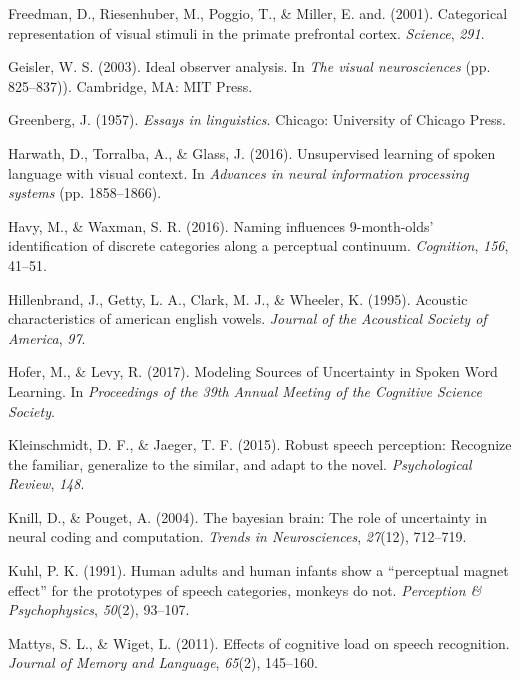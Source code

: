 \documentclass[english,floatsintext,man]{apa6}
\theoremstyle{definition}
\theoremstyle{definition}
\theoremstyle{definition}
\theoremstyle{remark}
\begin{document}
\hypertarget{ref-freedman2001}{}
Freedman, D., Riesenhuber, M., Poggio, T., \& Miller, E. and. (2001).
Categorical representation of visual stimuli in the primate prefrontal
cortex. \emph{Science}, \emph{291}.

\hypertarget{ref-Geisler2003}{}
Geisler, W. S. (2003). Ideal observer analysis. In \emph{The visual
neurosciences} (pp. 825--837)). Cambridge, MA: MIT Press.

\hypertarget{ref-greenberg1957}{}
Greenberg, J. (1957). \emph{Essays in linguistics}. Chicago: University
of Chicago Press.

\hypertarget{ref-harwath2016}{}
Harwath, D., Torralba, A., \& Glass, J. (2016). Unsupervised learning of
spoken language with visual context. In \emph{Advances in neural
information processing systems} (pp. 1858--1866).

\hypertarget{ref-havy2016}{}
Havy, M., \& Waxman, S. R. (2016). Naming influences 9-month-olds'
identification of discrete categories along a perceptual continuum.
\emph{Cognition}, \emph{156}, 41--51.

\hypertarget{ref-hillenbrand1995}{}
Hillenbrand, J., Getty, L. A., Clark, M. J., \& Wheeler, K. (1995).
Acoustic characteristics of american english vowels. \emph{Journal of
the Acoustical Society of America}, \emph{97}.

\hypertarget{ref-hofer2017}{}
Hofer, M., \& Levy, R. (2017). Modeling Sources of Uncertainty in Spoken
Word Learning. In \emph{Proceedings of the 39th Annual Meeting of the
Cognitive Science Society}.

\hypertarget{ref-kleinschmidt2015}{}
Kleinschmidt, D. F., \& Jaeger, T. F. (2015). Robust speech perception:
Recognize the familiar, generalize to the similar, and adapt to the
novel. \emph{Psychological Review}, \emph{148}.

\hypertarget{ref-Knill04}{}
Knill, D., \& Pouget, A. (2004). The bayesian brain: The role of
uncertainty in neural coding and computation. \emph{Trends in
Neurosciences}, \emph{27}(12), 712--719.

\hypertarget{ref-kuhl1991}{}
Kuhl, P. K. (1991). Human adults and human infants show a ``perceptual
magnet effect'' for the prototypes of speech categories, monkeys do not.
\emph{Perception \& Psychophysics}, \emph{50}(2), 93--107.

\hypertarget{ref-mattys11}{}
Mattys, S. L., \& Wiget, L. (2011). Effects of cognitive load on speech
recognition. \emph{Journal of Memory and Language}, \emph{65}(2),
145--160.
\end{document}
